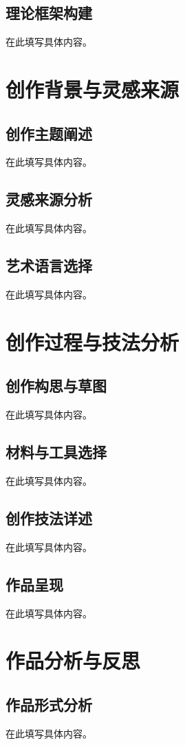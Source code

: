 \documentclass[a4paper,12pt,oneside]{ctexart}
\begin{document}
\subsection{理论框架构建}
在此填写具体内容。


\section{创作背景与灵感来源}
\subsection{创作主题阐述}
在此填写具体内容。

\subsection{灵感来源分析}
在此填写具体内容。

\subsection{艺术语言选择}
在此填写具体内容。


\section{创作过程与技法分析}
\subsection{创作构思与草图}
在此填写具体内容。

\subsection{材料与工具选择}
在此填写具体内容。

\subsection{创作技法详述}
在此填写具体内容。

\subsection{作品呈现}
在此填写具体内容。


\section{作品分析与反思}
\subsection{作品形式分析}
在此填写具体内容。
\end{document}

